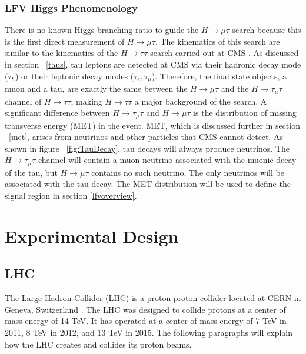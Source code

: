 \documentclass[oneside, letterpaper, oldfontcommands]{memoir}
\begin{document}
\subsection{LFV Higgs Phenomenology}
\qquad There is no known Higgs branching ratio to guide the $H \rightarrow \mu\tau$ search because this is the first direct measurement of $H \rightarrow \mu \tau$. The kinematics of this search are similar to the kinematics of the $H \rightarrow \tau\tau$ search carried out at CMS \cite{Chatrchyan:2012xdj}. As discussed in section ~\ref{taus}, tau leptons are detected at CMS via their hadronic decay mode ($\tau_{h}$) or their leptonic decay modes ($\tau_{e}, \tau_{\mu}$). Therefore, the final state objects, a muon and a tau, are exactly the same between the $H \rightarrow \mu \tau$ and the $H \rightarrow \tau_{\mu} \tau$ channel of $H \rightarrow \tau\tau$, making $H \rightarrow \tau\tau$ a major background of the search. A significant difference between $H \rightarrow \tau_{\mu} \tau$ and $H \rightarrow \mu \tau$ is the distribution of missing transverse energy (MET) in the event. MET, which is discussed further in section ~\ref{met}, arises from neutrinos and other particles that CMS cannot detect. As shown in figure ~\ref{fig:TauDecay}, tau decays will always produce neutrinos. The $H \rightarrow \tau_{\mu} \tau$ channel will contain a muon neutrino associated with the muonic decay of the tau, but $H \rightarrow \mu \tau$ contains no such neutrino. The only neutrinos will be associated with the tau decay. The MET distribution will be used to define the signal region in section \ref{lfvoverview}.





\chapter{Experimental Design}\label{experiment}

\section{LHC}\label{lhc}

\qquad The Large Hadron Collider (LHC) is a proton-proton collider located at CERN in Geneva, Switzerland \cite{1748-0221-3-08-S08001}. The LHC was designed to collide protons at a center of mass energy of 14 TeV. It has operated at a center of mass energy of 7 TeV in 2011, 8 TeV in 2012, and 13 TeV in 2015. The following paragraphs will explain how the LHC creates and collides its proton beams.
\end{document}
